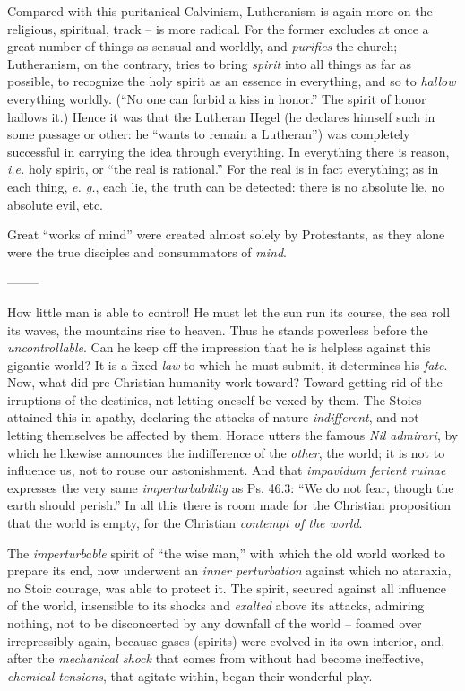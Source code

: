 \documentclass[12pt,a4paper]{book}
\begin{document}
Compared with this puritanical Calvinism, Lutheranism is again more on the 
religious, spiritual, track -- is more radical. For the former excludes at 
once a great number of things as sensual and worldly, and \textit{purifies} 
the church; Lutheranism, on the contrary, tries to bring \textit{spirit} into 
all things as far as possible, to recognize the holy spirit as an essence in 
everything, and so to \textit{hallow} everything worldly. (``No one can 
forbid a kiss in honor.'' The spirit of honor hallows it.) Hence it was that 
the Lutheran Hegel (he declares himself such in some passage or other: he 
``wants to remain a Lutheran'') was completely successful in carrying the 
idea through everything. In everything there is reason, \textit{i.e.} holy 
spirit, or ``the real is rational.'' For the real is in fact everything; as 
in each thing, \textit{e. g.}, each lie, the truth can be detected: there is 
no absolute lie, no absolute evil, etc.

Great ``works of mind'' were created almost solely by Protestants, as they 
alone were the true disciples and consummators of \textit{mind}.

\begin{center}
--------\end{center}


How little man is able to control! He must let the sun run its course, the sea 
roll its waves, the mountains rise to heaven. Thus he stands powerless before 
the \textit{uncontrollable}. Can he keep off the impression that he is 
helpless against this gigantic world? It is a fixed \textit{law} to which he 
must submit, it determines his \textit{fate}. Now, what did pre-Christian 
humanity work toward? Toward getting rid of the irruptions of the destinies, 
not letting oneself be vexed by them. The Stoics attained this in apathy, 
declaring the attacks of nature \textit{indifferent}, and not letting 
themselves be affected by them. Horace utters the famous \textit{Nil 
admirari}, by which he likewise announces the indifference of the 
\textit{other}, the world; it is not to influence us, not to rouse our 
astonishment. And that \textit{impavidum ferient ruinae} expresses the very 
same \textit{imperturbability} as Ps. 46.3: ``We do not fear, though the 
earth should perish.'' In all this there is room made for the Christian 
proposition that the world is empty, for the Christian \textit{contempt of the 
world}.

The \textit{imperturbable} spirit of ``the wise man,'' with which the old 
world worked to prepare its end, now underwent an \textit{inner perturbation} 
against which no ataraxia, no Stoic courage, was able to protect it. The 
spirit, secured against all influence of the world, insensible to its shocks 
and \textit{exalted} above its attacks, admiring nothing, not to be 
disconcerted by any downfall of the world -- foamed over irrepressibly again, 
because gases (spirits) were evolved in its own interior, and, after the 
\textit{mechanical shock} that comes from without had become ineffective, 
\textit{chemical tensions}, that agitate within, began their wonderful play.
\end{document}
